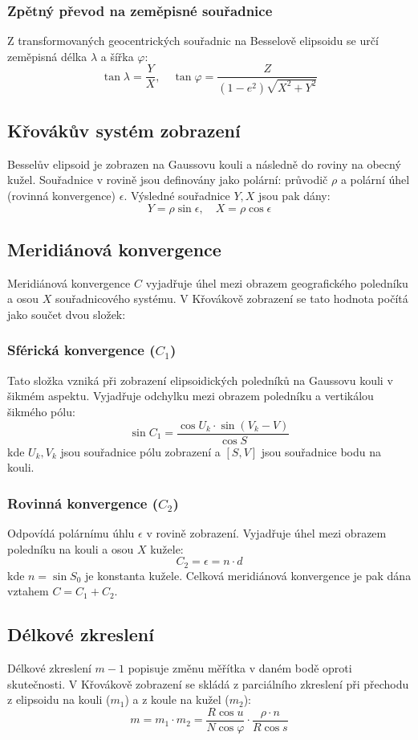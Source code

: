 \documentclass[12pt]{article}
\begin{document}
\subsubsection{Zpětný převod na zeměpisné souřadnice}
Z transformovaných geocentrických souřadnic na Besselově elipsoidu se určí zeměpisná délka $\lambda$ a šířka $\varphi$:
\[
\tan \lambda = \frac{Y}{X}, \quad \tan \varphi = \frac{Z}{(1 - e^2) \sqrt{X^2 + Y^2}}
\]

\subsection{Křovákův systém zobrazení}
Besselův elipsoid je zobrazen na Gaussovu kouli a následně do roviny na obecný kužel. Souřadnice v rovině jsou definovány jako polární: průvodič $\rho$ a polární úhel (rovinná konvergence) $\epsilon$. Výsledné souřadnice $Y, X$ jsou pak dány:
\[
Y = \rho \sin \epsilon, \quad X = \rho \cos \epsilon
\]

\subsection{Meridiánová konvergence}
Meridiánová konvergence $C$ vyjadřuje úhel mezi obrazem geografického poledníku a osou $X$ souřadnicového systému. V Křovákově zobrazení se tato hodnota počítá jako součet dvou složek:

\subsubsection{Sférická konvergence ($C_1$)}
Tato složka vzniká při zobrazení elipsoidických poledníků na Gaussovu kouli v šikmém aspektu. Vyjadřuje odchylku mezi obrazem poledníku a vertikálou šikmého pólu:
\[
\sin C_1 = \frac{\cos U_k \cdot \sin(V_k - V)}{\cos S}
\]
kde $U_k, V_k$ jsou souřadnice pólu zobrazení a $[S, V]$ jsou souřadnice bodu na kouli.

\subsubsection{Rovinná konvergence ($C_2$)}
Odpovídá polárnímu úhlu $\epsilon$ v rovině zobrazení. Vyjadřuje úhel mezi obrazem poledníku na kouli a osou $X$ kužele:
\[
C_2 = \epsilon = n \cdot d
\]
kde $n = \sin S_0$ je konstanta kužele. Celková meridiánová konvergence je pak dána vztahem $C = C_1 + C_2$.

\subsection{Délkové zkreslení}
Délkové zkreslení $m-1$ popisuje změnu měřítka v daném bodě oproti skutečnosti. V Křovákově zobrazení se skládá z parciálního zkreslení při přechodu z elipsoidu na kouli ($m_1$) a z koule na kužel ($m_2$):
\[
m = m_1 \cdot m_2 = \frac{R \cos u}{N \cos \varphi} \cdot \frac{\rho \cdot n}{R \cos s}
\]
\newpage
\end{document}
